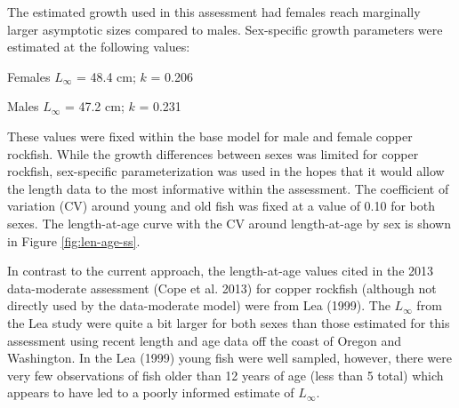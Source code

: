 \documentclass[11pt,
  english,
  a4paper,
]{article}
\begin{document}
\leavevmode\tagmcend\tagstructend\par


The estimated growth used in this assessment had females reach marginally larger asymptotic sizes compared to males. Sex-specific growth parameters were estimated at the following values:

\leavevmode\tagmcend\tagstructend\par

\begin{centering}

Females $L_{\infty}$ = 48.4 cm; $k$ = 0.206

Males $L_{\infty}$ = 47.2 cm; $k$ = 0.231

\end{centering}

\vspace{0.5cm}


These values were fixed within the base model for male and female copper rockfish. While the growth differences between sexes was limited for copper rockfish, sex-specific parameterization was used in the hopes that it would allow the length data to the most informative within the assessment. The coefficient of variation (CV) around young and old fish was fixed at a value of 0.10 for both sexes. The length-at-age curve with the CV around length-at-age by sex is shown in Figure \ref{fig:len-age-ss}.

\leavevmode\tagmcend\tagstructend\par


In contrast to the current approach, the length-at-age values cited in the 2013 data-moderate assessment {(Cope et al. 2013)\leavevmode\tagmcend\tagstructend} for copper rockfish (although not directly used by the data-moderate model) were from Lea {(1999)\leavevmode\tagmcend\tagstructend}. The {\(L_{\infty}\)\leavevmode\tagmcend\tagstructend} from the Lea study were quite a bit larger for both sexes than those estimated for this assessment using recent length and age data off the coast of Oregon and Washington. In the Lea {(1999)\leavevmode\tagmcend\tagstructend} young fish were well sampled, however, there were very few observations of fish older than 12 years of age (less than 5 total) which appears to have led to a poorly informed estimate of {\(L_{\infty}\)\leavevmode\tagmcend\tagstructend}.
\end{document}
